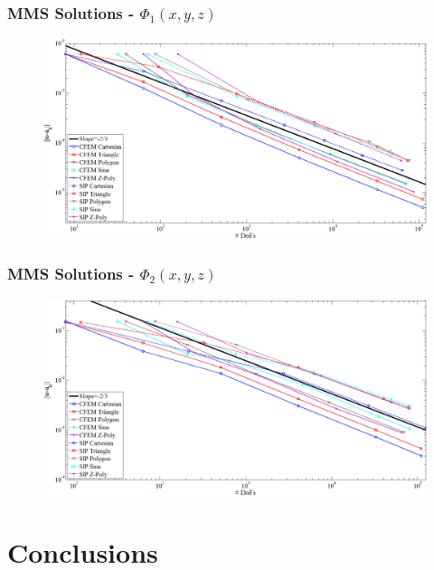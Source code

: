 \documentclass[]{beamer}
\begin{document}
\begin{frame}[t]\frametitle{MMS Solutions - $\Phi_1 (x,y,z)$}
    	\begin{figure}[t]
		\centering
		\includegraphics[width=1.0\textwidth]{images/mms_3d_quad_full_paint.png}
	\end{figure}
\end{frame}
\begin{frame}[t]\frametitle{MMS Solutions - $\Phi_2 (x,y,z)$}
    	\begin{figure}[t]
		\centering
		\includegraphics[width=1.0\textwidth]{images/mms_3d_gauss_full_paint.png}
	\end{figure}
\end{frame}
\section{Conclusions}
\end{document}
